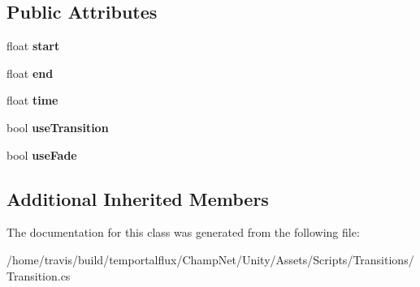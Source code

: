 \subsection*{Public Attributes}
\begin{DoxyCompactItemize}
\item 
\hypertarget{class_transition_a51032520a65cb2ef2b5436b874aee39f}{float {\bfseries start}}\label{class_transition_a51032520a65cb2ef2b5436b874aee39f}

\item 
\hypertarget{class_transition_a960afdae6e8871c31b095b19399dc74c}{float {\bfseries end}}\label{class_transition_a960afdae6e8871c31b095b19399dc74c}

\item 
\hypertarget{class_transition_a0eb1c5ad8ef7e837e4cc3ff3d0b3a0f9}{float {\bfseries time}}\label{class_transition_a0eb1c5ad8ef7e837e4cc3ff3d0b3a0f9}

\item 
\hypertarget{class_transition_afeb8e3e45338d8adc3455c06f88d5707}{bool {\bfseries use\-Transition}}\label{class_transition_afeb8e3e45338d8adc3455c06f88d5707}

\item 
\hypertarget{class_transition_a0101ba46e561d3104b22a7fa8a5242f7}{bool {\bfseries use\-Fade}}\label{class_transition_a0101ba46e561d3104b22a7fa8a5242f7}

\end{DoxyCompactItemize}
\subsection*{Additional Inherited Members}


The documentation for this class was generated from the following file\-:\begin{DoxyCompactItemize}
\item 
/home/travis/build/temportalflux/\-Champ\-Net/\-Unity/\-Assets/\-Scripts/\-Transitions/Transition.\-cs\end{DoxyCompactItemize}
